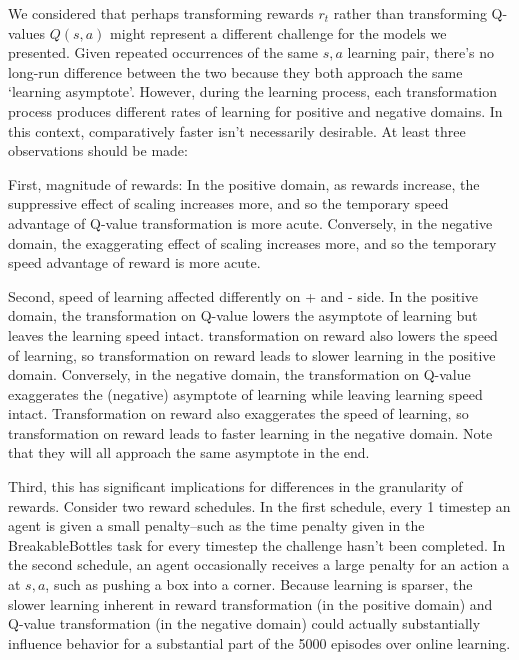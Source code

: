 
We considered that perhaps transforming rewards $r_t$ rather than transforming Q-values $Q(s, a)$ might represent a different challenge for the models we presented. Given repeated occurrences of the same $s, a$ learning pair, there's no long-run difference between the two because they both approach the same `learning asymptote'. However, during the learning process, each transformation process produces different rates of learning for positive and negative domains. In this context, comparatively faster isn't necessarily desirable. At least three observations should be made:

First, magnitude of rewards: In the positive domain, as rewards increase, the suppressive effect of scaling increases more, and so the temporary speed advantage of Q-value transformation is more acute. Conversely, in the negative domain, the exaggerating effect of scaling increases more, and so the temporary speed advantage of reward is more acute.

Second, speed of learning affected differently on + and - side. In the positive domain, the transformation on Q-value lowers the asymptote of learning but leaves the learning speed intact. transformation on reward also lowers the speed of learning, so transformation on reward leads to slower learning in the positive domain. Conversely, in the negative domain, the transformation on Q-value exaggerates the (negative) asymptote of learning while leaving learning speed intact. Transformation on reward also exaggerates the speed of learning, so transformation on reward leads to faster learning in the negative domain. Note that they will all approach the same asymptote in the end.

Third, this has significant implications for differences in the granularity of rewards. Consider two reward schedules. In the first schedule, every 1 timestep an agent is given a small penalty--such as the time penalty given in the BreakableBottles task for every timestep the challenge hasn't been completed. In the second schedule, an agent occasionally receives a large penalty for an action a at $s, a$, such as pushing a box into a corner. Because learning is sparser, the slower learning inherent in reward transformation (in the positive domain) and Q-value transformation (in the negative domain) could actually substantially influence behavior for a substantial part of the 5000 episodes over online learning.

